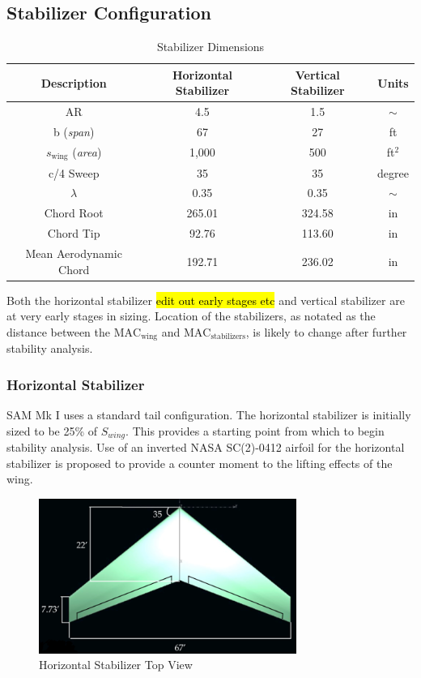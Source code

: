 \subsection{Stabilizer Configuration}

\begin{table}[!h]
    \centering
    \caption{Stabilizer Dimensions}
    \begin{tabular}{|c||c|c|c|} \toprule
        \textbf{Description} & {\textbf{Horizontal Stabilizer}} & 
        {\textbf{Vertical Stabilizer}} & \textbf{Units}\\ \midrule \hline
        AR & 4.5 & 1.5 & $\sim$ \\ \hline
        b (\textit{span}) & 67 & 27 & ft \\ \hline 
        $s_{\text{wing}}$ (\textit{area}) & 1,000 & 500 & ft$^2$ \\ \hline
        c/4 Sweep & 35 & 35 & degree \\ \hline
        $\lambda$ & 0.35 & 0.35 & $\sim$ \\ \hline
        Chord Root & 265.01 & 324.58 & in \\ \hline
        Chord Tip & 92.76 & 113.60 & in \\ \hline   
        Mean Aerodynamic Chord & 192.71 & 236.02 & in \\ \bottomrule
    \end{tabular}
    \label{tab:wingsizing}
\end{table}

Both the horizontal stabilizer \hl{edit out early stages etc} and vertical stabilizer are at very early stages in sizing.  Location of the stabilizers, as notated as the distance between the $\text{MAC}_{\text{wing}}$ and $\text{MAC}_{\text{stabilizers}}$, is likely to change after further stability analysis.

\subsubsection{Horizontal Stabilizer}
SAM Mk I uses a standard tail configuration.  The horizontal stabilizer is initially sized to be 25\% of $S_{wing}$.  This provides a starting point from which to begin stability analysis.  Use of an inverted NASA SC(2)-0412 airfoil for the horizontal stabilizer is proposed to provide a counter moment to the lifting effects of the wing.
\begin{figure}[!h]
    \centering
    \includegraphics[width=0.75\textwidth]{Photos/stab/htail.png}
    \caption{Horizontal Stabilizer Top View}
    \label{fig:htailstab}
\end{figure}

